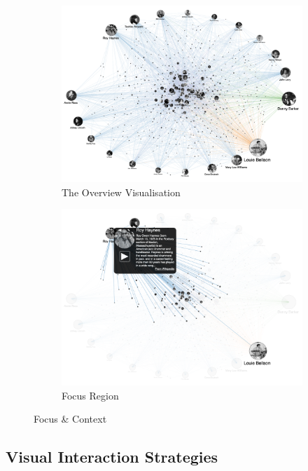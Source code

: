 \begin{figure}[h]
\begin{subfigure}{.5\textwidth}
  \centering
  \captionsetup{justification=centering}
  \includegraphics[width=.8\linewidth]{Report-latex/tex_files/pics/f1.png}  
  \caption{The Overview Visualisation}
  \label{fig:sub-first}
\end{subfigure}
\begin{subfigure}{.5\textwidth}
  \centering
  \captionsetup{justification=centering}
  \includegraphics[width=.8\linewidth]{Report-latex/tex_files/pics/f2.png}  
  \caption{Focus Region}
  \label{fig:sub-second}
\end{subfigure}
\captionsetup{justification=centering}
\caption{Focus \& Context \cite{linkedjazz}}
\label{fig:Focus\&Context}
\end{figure}

\subsection{Visual Interaction Strategies}

